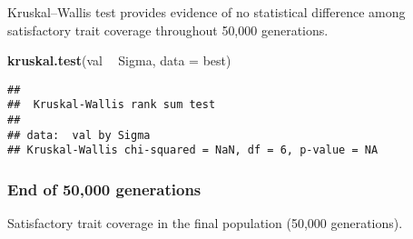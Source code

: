 \documentclass[]{book}
\newenvironment{Shaded}{\begin{snugshade}}{\end{snugshade}}
\newcommand{\DataTypeTok}[1]{\textcolor[rgb]{0.13,0.29,0.53}{#1}}
\newcommand{\KeywordTok}[1]{\textcolor[rgb]{0.13,0.29,0.53}{\textbf{#1}}}
\newcommand{\NormalTok}[1]{#1}
\newcommand{\OperatorTok}[1]{\textcolor[rgb]{0.81,0.36,0.00}{\textbf{#1}}}
\newcommand{\StringTok}[1]{\textcolor[rgb]{0.31,0.60,0.02}{#1}}
\begin{document}
Kruskal--Wallis test provides evidence of no statistical difference among satisfactory trait coverage throughout 50,000 generations.

\begin{Shaded}
\begin{Highlighting}[]
\KeywordTok{kruskal.test}\NormalTok{(val }\OperatorTok{~}\StringTok{ }\NormalTok{Sigma, }\DataTypeTok{data =}\NormalTok{ best)}
\end{Highlighting}
\end{Shaded}

\begin{verbatim}
## 
##  Kruskal-Wallis rank sum test
## 
## data:  val by Sigma
## Kruskal-Wallis chi-squared = NaN, df = 6, p-value = NA
\end{verbatim}

\hypertarget{end-of-50000-generations-20}{%
\subsubsection{End of 50,000 generations}\label{end-of-50000-generations-20}}

Satisfactory trait coverage in the final population (50,000 generations).
\end{document}
